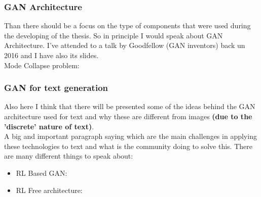 \subsubsection{GAN Architecture}
Than there should be a focus on the type of components that were used during the developing of the thesis. So in principle I would speak about GAN Architecture. I've attended to a talk by Goodfellow (GAN inventors) back un 2016 and I have also its slides. \\
Mode Collapse problem:
\subsubsection{GAN for text generation}
Also here I think that there will be presented some of the ideas behind the GAN architecture used for text and why these are different from images \textbf{(due to the 'discrete' nature of text)}. \\
A big and important paragraph saying which are the main challenges in applying these technologies to text and what is the community doing to solve this. 
There are many different things to speak about:
\begin{itemize}
	\item RL Based GAN:
	\item RL Free architecture:
\end{itemize}
